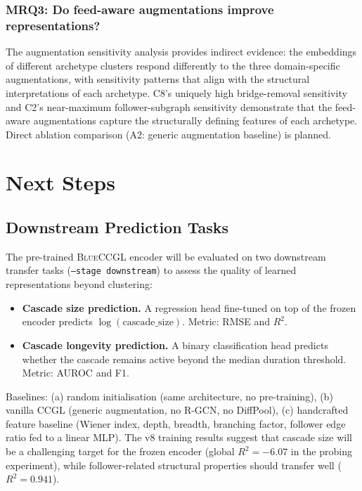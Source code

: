 \documentclass[12pt, a4paper]{article}
\newcommand{\BLUECCGL}{\textsc{BlueCCGL}\xspace}
\begin{document}
\subsubsection*{MRQ3: Do feed-aware augmentations improve representations?}

The augmentation sensitivity analysis provides indirect evidence: the embeddings of different archetype clusters respond differently to the three domain-specific augmentations, with sensitivity patterns that align with the structural interpretations of each archetype. C8's uniquely high bridge-removal sensitivity and C2's near-maximum follower-subgraph sensitivity demonstrate that the feed-aware augmentations capture the structurally defining features of each archetype. Direct ablation comparison (A2: generic augmentation baseline) is planned.

\section{Next Steps}
\label{sec:nextsteps}

\subsection{Downstream Prediction Tasks}

The pre-trained \BLUECCGL encoder will be evaluated on two downstream transfer tasks (\texttt{--stage downstream}) to assess the quality of learned representations beyond clustering:

\begin{itemize}
  \item \textbf{Cascade size prediction.} A regression head fine-tuned on top of the frozen encoder predicts $\log(\text{cascade\_size})$. Metric: RMSE and $R^2$.
  \item \textbf{Cascade longevity prediction.} A binary classification head predicts whether the cascade remains active beyond the median duration threshold. Metric: AUROC and F1.
\end{itemize}

Baselines: (a) random initialisation (same architecture, no pre-training), (b) vanilla CCGL (generic augmentation, no R-GCN, no DiffPool), (c) handcrafted feature baseline (Wiener index, depth, breadth, branching factor, follower edge ratio fed to a linear MLP). The v8 training results suggest that cascade size will be a challenging target for the frozen encoder (global $R^2 = -6.07$ in the probing experiment), while follower-related structural properties should transfer well ($R^2 = 0.941$).
\end{document}
